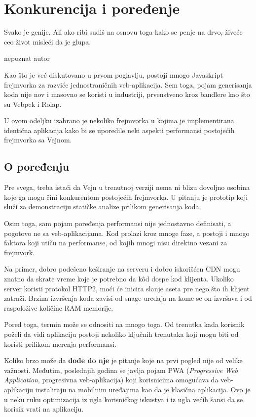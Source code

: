 \chapter{Konkurencija i poređenje}

\epigraph{
  Svako je genije. Ali ako ribi sudiš na osnovu toga kako se penje na drvo, živeće ceo život misleći da je glupa.
}{nepoznat autor}

Kao što je već diskutovano u prvom poglavlju, postoji mnogo Javaskript frejmvorka za razviće jednostraničnih veb-aplikacija.
Sem toga, pojam generisanja koda nije nov i masovno se koristi u industriji, prvenstveno kroz bandlere kao što su Vebpek i Rolap.

U ovom odeljku izabrano je nekoliko frejmvorka u kojima je implementirana identična  aplikacija kako bi se uporedile neki aspekti performansi postojećih frejmvorka sa Vejnom.

\section{O poređenju}

Pre svega, treba istaći da Vejn u trenutnoj verziji nema ni blizu dovoljno osobina koje ga mogu čini konkurentom postojećih frejmvorka.
U pitanju je prototip koji služi za demonstraciju statičke analize prilikom generisanja koda.

Osim toga, sam pojam poređenja performansi nije jednostavno definisati, a pogotovo ne sa veb-aplikacijama.
Kod prolazi kroz mnoge faze, a postoji i mnogo faktora koji utiču na performanse, od kojih mnogi nisu direktno vezani za frejmvork.

Na primer, dobro podešeno keširanje na serveru i dobro iskorišćen CDN mogu znatno da skrate vreme koje je potrebno da kôd dospe kod klijenta.
Ukoliko server koristi protokol HTTP2, moći će inicira slanje aseta pre nego što ih klijent zatraži.
Brzina izvršenja koda zavisi od snage uređaja na kome se on izvršava i od raspoložive količine RAM memorije.

Pored toga, termin  može se odnositi na mnogo toga.
Od trenutka kada korisnik poželi da vidi aplikaciju postoji nekoliko ključnih trenutaka koji mogu biti od koristi prilikom merenja performansi.

Koliko brzo može da \textbf{dođe do nje} je pitanje koje na prvi pogled nije od velike važnosti.
Međutim, poslednjih godina se javlja pojam PWA (\textsl{Progressive Web Application}, progresivna veb-aplikacija) koji korisnicima omogućava da veb-aplikaciju instaliraju na mobilnim uređajima kao da je klasična aplikacija.
Ovo je u neku ruku optimizacija iz ugla korisničkog iskustva i iz ugla većih šansi da se korisik vrati na aplikaciju.


